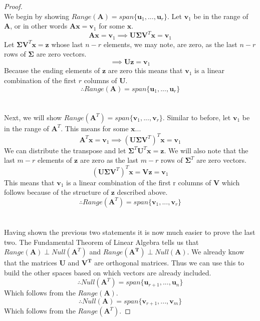 \documentclass[]{article}
\begin{document}
	\begin{proof}~\\
		We begin by showing $Range(\mathbf{A})=span\{\mathbf{u}_1,...,\mathbf{u}_r\}$. Let $\mathbf{v}_1$ be in the range of $\mathbf{A}$, or in other words $\mathbf{Ax}=\mathbf{v}_1$ for some $\mathbf{x}$.
		\[\mathbf{Ax}=\mathbf{v}_1\implies \mathbf{U\Sigma V}^T\mathbf{x}=\mathbf{v}_1\]
		Let $\mathbf{\Sigma V}^T\mathbf{x}=\mathbf{z}$ whose last $n-r$ elements, we may note, are zero, as the last $n-r$ rows of $\mathbf{\Sigma}$ are zero vectors.
		\[\implies \mathbf{Uz}=\mathbf{v}_1\]
		Because the ending elements of $\mathbf{z}$ are zero this means that $\mathbf{v}_1$ is a linear combination of the first $r$ columns of $\mathbf{U}$.
		\[\therefore Range(\mathbf{A})=span\{\mathbf{u}_1,...,\mathbf{u}_r\}\]
		\\~\\
		Next, we will show $Range(\mathbf{A}^T)=span\{\mathbf{v}_1,...,\mathbf{v}_r\}$. Similar to before, let $\mathbf{v}_1$ be in the range of $\mathbf{A}^T$. This means for some $\mathbf{x}$...
		\[\mathbf{A}^T\mathbf{x}=\mathbf{v}_1\implies (\mathbf{U\Sigma V}^T)^T\mathbf{x}=\mathbf{v}_1\]
		We can distribute the transpose and let $\mathbf{\Sigma}^T\mathbf{U}^T\mathbf{x}=\mathbf{z}$. We will also note that the last $m-r$ elements of $\mathbf{z}$ are zero as the last $m-r$ rows of $\mathbf{\Sigma}^T$ are zero vectors.
		\[(\mathbf{U\Sigma V}^T)^T\mathbf{x}=\mathbf{Vz}=\mathbf{v}_1\]
		This means that $\mathbf{v}_1$ is a linear combination of the first r columns of $\mathbf{V}$ which follows because of the structure of $\mathbf{z}$ described above.
		\[\therefore Range(\mathbf{A}^T)=span\{\mathbf{v}_1,...,\mathbf{v}_r\}\]
		\\~\\
		Having shown the previous two statements it is now much easier to prove the last two. The Fundamental Theorem of Linear Algebra tells us that $Range(\mathbf{A})\perp Null(\mathbf{A}^T)$ and $Range(\mathbf{A^T})\perp Null(\mathbf{A})$. We already know that the matrices $\mathbf{U}$ and $\mathbf{V^T}$ are orthogonal matrices. Thus we can use this to build the other spaces based on which vectors are already included.
		\[\therefore Null(\mathbf{A}^T)=span\{\mathbf{u}_{r+1},...,\mathbf{u}_n\}\]
		Which follows from the $Range(\mathbf{A})$.
		\[\therefore Null(\mathbf{A})=span\{\mathbf{v}_{r+1},...,\mathbf{v}_m\}\]
		Which follows from the $Range(\mathbf{A}^T)$.
	\end{proof}
	
\end{document}
